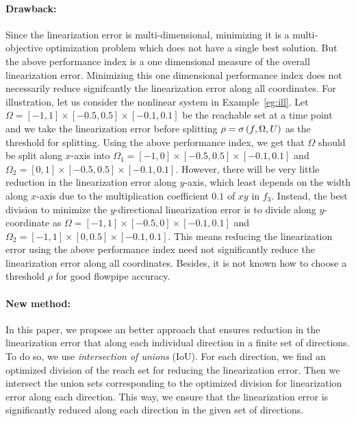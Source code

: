 \paragraph{Drawback:}  Since the linearization error is
multi-dimensional, minimizing it is a multi-objective optimization
problem which does not have a single best solution.  But the above
performance index is a one dimensional measure of the overall
linearization error.  Minimizing this one dimensional performance
index does not necessarily reduce signifcantly the linearization error
along all coordinates.  For illustration, let us consider the
nonlinear system in Example~\ref{eg:ill}.  Let $\Omega =
[-1,1]\times[-0.5,0.5]\times[-0.1,0.1]$ be the reachable set at a time
point and we take the linearization error before splitting $\rho
= \sigma\left(f,\Omega,U\right)$ as the threshold for splitting.  Using the
above performance index, we get that $\Omega$ should be split along
$x$-axis into $\Omega_1 = [-1,0]\times[-0.5,0.5]\times[-0.1,0.1]$ and
$\Omega_2 = [0,1]\times[-0.5,0.5]\times[-0.1,0.1]$.  However, there
will be very little reduction in the linearization error along
$y$-axis, which least depends on the width along $x$-axis due to the
multiplication coefficient $0.1$ of $xy$ in $f_3$.  Instead, the best
division to minimize the $y$-directional linearization error is to
divide along $y$-coordinate as $\Omega =
[-1,1]\times[-0.5,0]\times[-0.1,0.1]$ and $\Omega_2 =
[-1,1]\times[0,0.5]\times[-0.1,0.1]$.  This means reducing the
linearization error using the above performance index need not
significantly reduce the linearization error along all coordinates.
Besides, it is not known how to choose a threshold $\rho$ for good
flowpipe accuracy.

\paragraph{New method:}  In this paper, we propose an better approach
that ensures reduction in the linearization error that along each
individual direction in a finite set of directions. 
To do so, we
use \emph{intersection of unions} (IoU).  For each direction, we find
an optimized division of the reach set for reducing the linearization
error.  Then we intersect the union sets corresponding to the
optimized division for linearization error along each direction.  This
way, we ensure that the linearization error is significantly reduced
along each direction in the given set of directions.

